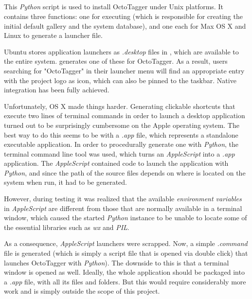\subsection{}
\label{sub:mod:install}
\def\kapitelautor{Erik Ritschl}

This \emph{Python} script is used to install OctoTagger under Unix platforms. It contains three functions: one for executing  (which is responsible for creating the initial default gallery and the system database), and one each for Max OS X and Linux to generate a launcher file.

Ubuntu stores application launchers as \emph{.desktop} files  in , which are available to the entire system.  generates one of these for OctoTagger. As a result, users searching for "OctoTagger" in their launcher menu will find an appropriate entry with the project logo as icon, which can also be pinned to the taskbar. Native integration has been fully achieved.

Unfortunately, OS X made things harder. Generating clickable shortcuts that execute two lines of terminal commands in order to launch a desktop application turned out to be surprisingly cumbersome on the Apple operating system. The best way to do this seems to be with a \emph{.app} file, which represents a standalone executable application. In order to procedurally generate one with \emph{Python}, the terminal command line tool  was used, which turns an \emph{AppleScript} into a \emph{.app} application. The \emph{AppleScript} contained code to launch the application with \emph{Python}, and since the path of the source files depends on where  is located on the system when run, it had to be generated. 

However, during testing it was realized that the available \emph{environment variables} in \emph{AppleScript} are different from those that are normally available in a terminal window, which caused the started \emph{Python} instance to be unable to locate some of the essential libraries such as \emph{wx} and \emph{PIL}.

As a consequence, \emph{AppleScript} launchers were scrapped. Now, a simple \emph{.command} file is generated (which is simply a script file that is opened via double click) that launches OctoTagger with \emph{Python}). The downside to this is that a terminal window is opened as well. Ideally, the whole application should be packaged into a \emph{.app} file, with all its files and folders. But this would require considerably more work and is simply outside the scope of this project.